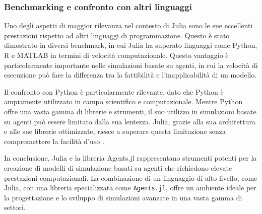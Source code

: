 \subsubsection{Benchmarking e confronto con altri linguaggi}

Uno degli aspetti di maggior rilevanza nel contesto di Julia sono le sue eccellenti prestazioni rispetto ad altri linguaggi di programmazione. 
Questo è stato dimostrato in diversi benchmark, in cui Julia ha superato 
linguaggi come Python, R e MATLAB \cite{ABAR201713} in termini di velocità 
computazionale. Questo vantaggio è particolarmente importante nelle 
simulazioni basate su agenti, in cui la velocità di esecuzione può fare 
la differenza tra la fattibilità e l'inapplicabilità di un modello.

Il confronto con Python è particolarmente rilevante, dato che Python è 
ampiamente utilizzato in campo scientifico e computazionale. Mentre 
Python offre una vasta gamma di librerie e strumenti, il suo utilizzo 
in simulazioni basate su agenti può essere limitato dalla sua lentezza. 
Julia, grazie alla sua architettura e alle sue librerie ottimizzate, 
riesce a superare questa limitazione senza compromettere la facilità 
d'uso \cite{rackauckas2020universal} \cite{rackauckas2019diffeqflux} \cite{rackauckas2017differentialequations} 
\cite{innes2018fashionable} \cite{Innes2018} \cite{pal2023lux}.

In conclusione, Julia e la libreria Agents.jl rappresentano strumenti 
potenti per la creazione di modelli di simulazione basati su agenti che 
richiedono elevate prestazioni computazionali. La combinazione di un 
linguaggio di alto livello, come Julia, con una libreria specializzata 
come \texttt{Agents.jl}, offre un ambiente ideale per la progettazione e lo 
sviluppo di simulazioni avanzate in una vasta gamma di settori.

